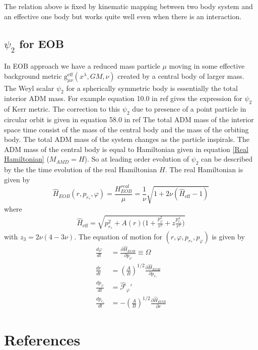 \documentclass[prd,preprintnumbers,onecolumn,eqsecnum,floatfix,letter]{revtex4}
\begin{document}
The relation above is fixed by kinematic mapping between two body system and an effective one body but works quite well even when there is an interaction. 
\subsection{$\psi_{2}$ for EOB} 
In EOB approach we have a reduced mass particle $\mu$ moving in some effective background metric $\text{g}^{\text{eff}}_{\mu\nu}\left(x^{\lambda}, GM, \nu\right)$ created by a central body of larger mass. The Weyl scalar $\psi_{2}$ for a spherically symmetric body is essentially the total interior ADM mass. For example equation 10.0 in ref\cite{Newman:2014} gives the expression for $\psi_{2}$ of Kerr metric. The correction to this $\psi_{2}$ due to presence of a point particle in circular orbit is given in equation 58.0 in ref\cite{Merlin2016PRD}  The total ADM mass of the interior space time consist of the mass of the central body and the mass of the orbiting body. The total ADM mass of the system changes as the particle inspirals. The ADM mass of the central body is equal to Hamiltonian given in equation \ref{Real Hamiltonian} ($M_{AMD} = H$). So at leading order evolution of $\psi_{2}$ can be described by the the time evolution of the real Hamiltonian $H$. The real Hamiltonian is given by
    \begin{equation}
    	\hat{H}_{EOB}(r, p_{r_*}, \varphi) = \frac{H^{real}_{EOB}}{\mu} = \frac{1}{\nu}\sqrt{1 + 2\nu\left(\hat{H}_{\text{eff}}-1\right)}\nonumber
    \end{equation}
where
\begin{align}
\hat{H}_{\text{eff}} = \sqrt{p^2_{r_*} + A\left(r\right)\Bigg(1 + \frac{p_{\varphi}^2}{r^2} + z\frac{p_{r_*}^4}{r^2}\Bigg)}
\end{align}
with $z_3 = 2\nu(4-3\nu)$. The equation of motion for $\left(r, \varphi, p_{r_*}, p_{\varphi}\right)$ is given by
\begin{align}
	\frac{d\varphi}{dt} &= \frac{\partial\hat{H}_{EOB}}{\partial p_{\varphi}} \equiv \Omega\\
	\frac{dr}{dt} &=\left(\frac{A}{B}\right)^{1/2}\frac{\partial\hat{H}_{EOB}}{\partial p_{r_*}}\\
	\frac{dp_{\varphi}}{dt} &=\hat{\mathscr{F}}_{\varphi}'\\
	\frac{dp_{r_*}}{dt} &=-\left(\frac{A}{B}\right)^{1/2}\frac{\partial\hat{H}_{EOB}}{\partial r}
\end{align}
\section*{References}



\end{document}
